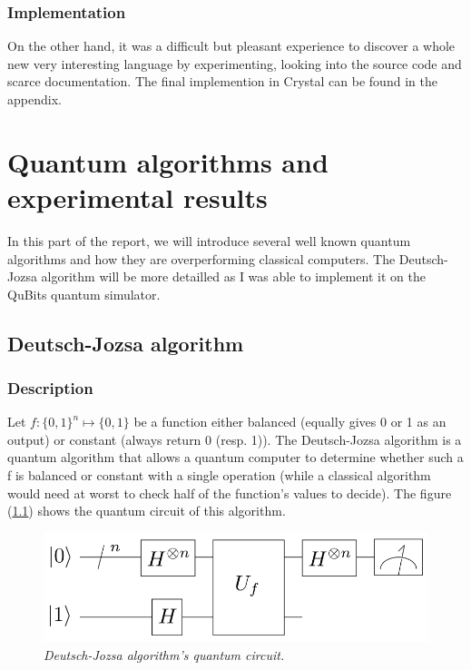 \documentclass[a4paper,12pt]{report}
\newcommand{\para}[1]{\par{#1}\\}
\begin{document}
        \subsection{Implementation}

\para{
    On the other hand, it was a difficult but pleasant experience to discover a whole new very interesting language by experimenting, looking into the source code and scarce documentation. The final implemention in Crystal can be found in the appendix.
}

%
%

\chapter{Quantum algorithms and experimental results}

\para{
    In this part of the report, we will introduce several well known quantum algorithms and how they are overperforming classical computers. The Deutsch-Jozsa algorithm will be more detailled as I was able to implement it on the QuBits quantum simulator.
}

    \section{Deutsch-Jozsa algorithm}
        \subsection{Description}

\para{
    Let $f : \{0,1\}^n \mapsto \{0,1\}$ be a function either balanced (equally gives 0 or 1 as an output) or constant (always return 0 (resp. 1)). The Deutsch-Jozsa algorithm is a quantum algorithm that allows a quantum computer to determine whether such a f is balanced or constant with a single operation (while a classical algorithm would need at worst to check half of the function's values to decide). The figure (\ref{deutsch}) shows the quantum circuit of this algorithm.
}

\begin{figure}[H]
	\begin{center}
		\includegraphics[scale=0.3]{images/deutsch}
	\end{center}
	\caption{\textit{Deutsch-Jozsa algorithm's quantum circuit. }}
	\label{deutsch}
\end{figure}
\end{document}
